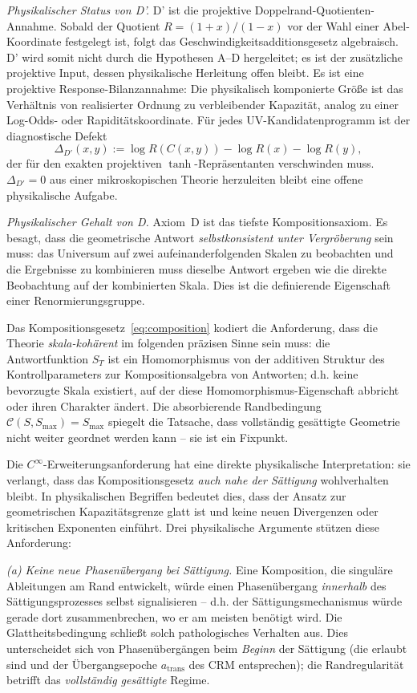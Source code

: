 \documentclass[aps,prd,twocolumn,superscriptaddress,nofootinbib]{revtex4-2}
\begin{document}
\textit{Physikalischer Status von D'.} D' ist die projektive Doppelrand-Quotienten-Annahme. Sobald der Quotient $R=(1+x)/(1-x)$ vor der Wahl einer Abel-Koordinate festgelegt ist, folgt das Geschwindigkeitsadditionsgesetz algebraisch. D' wird somit nicht durch die Hypothesen A--D hergeleitet; es ist der zusätzliche projektive Input, dessen physikalische Herleitung offen bleibt. Es ist eine projektive Response-Bilanzannahme: Die physikalisch komponierte Größe ist das Verhältnis von realisierter Ordnung zu verbleibender Kapazität, analog zu einer Log-Odds- oder Rapiditätskoordinate. Für jedes UV-Kandidatenprogramm ist der diagnostische Defekt
\[
  \Delta_{D'}(x,y):=\log R(C(x,y))-\log R(x)-\log R(y),
\]
der für den exakten projektiven $\tanh$-Repräsentanten verschwinden muss. $\Delta_{D'}=0$ aus einer mikroskopischen Theorie herzuleiten bleibt eine offene physikalische Aufgabe.

\textit{Physikalischer Gehalt von D.} Axiom~D ist das tiefste Kompositionsaxiom. Es besagt, dass die geometrische Antwort \textit{selbstkonsistent unter Vergröberung} sein muss: das Universum auf zwei aufeinanderfolgenden Skalen zu beobachten und die Ergebnisse zu kombinieren muss dieselbe Antwort ergeben wie die direkte Beobachtung auf der kombinierten Skala. Dies ist die definierende Eigenschaft einer Renormierungsgruppe.

Das Kompositionsgesetz~\eqref{eq:composition} kodiert die Anforderung, dass die Theorie \textit{skala-kohärent} im folgenden präzisen Sinne sein muss: die Antwortfunktion $S_T$ ist ein Homomorphismus von der additiven Struktur des Kontrollparameters zur Kompositionsalgebra von Antworten; d.h. keine bevorzugte Skala existiert, auf der diese Homomorphismus-Eigenschaft abbricht oder ihren Charakter ändert. Die absorbierende Randbedingung $\mathcal{C}(S, S_{\max}) = S_{\max}$ spiegelt die Tatsache, dass vollständig gesättigte Geometrie nicht weiter geordnet werden kann -- sie ist ein Fixpunkt.

Die $C^\infty$-Erweiterungsanforderung hat eine direkte physikalische Interpretation: sie verlangt, dass das Kompositionsgesetz \textit{auch nahe der Sättigung} wohlverhalten bleibt. In physikalischen Begriffen bedeutet dies, dass der Ansatz zur geometrischen Kapazitätsgrenze glatt ist und keine neuen Divergenzen oder kritischen Exponenten einführt. Drei physikalische Argumente stützen diese Anforderung:

\textit{(a) Keine neue Phasenübergang bei Sättigung.} Eine Komposition, die singuläre Ableitungen am Rand entwickelt, würde einen Phasenübergang \textit{innerhalb} des Sättigungsprozesses selbst signalisieren -- d.h. der Sättigungsmechanismus würde gerade dort zusammenbrechen, wo er am meisten benötigt wird. Die Glattheitsbedingung schließt solch pathologisches Verhalten aus. Dies unterscheidet sich von Phasenübergängen beim \textit{Beginn} der Sättigung (die erlaubt sind und der Übergangsepoche $a_{\mathrm{trans}}$ des CRM entsprechen); die Randregularität betrifft das \textit{vollständig gesättigte} Regime.
\end{document}

